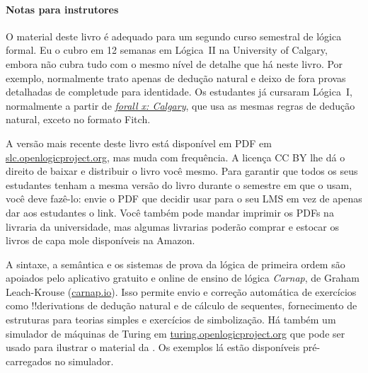 \paragraph{Notas para instrutores} O material deste livro é adequado
para um segundo curso semestral de lógica formal. Eu o cubro em 12
semanas em Lógica~II na University of Calgary, embora não cubra tudo
com o mesmo nível de detalhe que há neste livro. Por exemplo,
normalmente trato apenas de dedução natural e deixo de fora provas
detalhadas de completude para identidade. Os estudantes já cursaram
Lógica~I, normalmente a partir de
\emph{\href{https://forallx.openlogicproject.org}{forall x: Calgary}},
que usa as mesmas regras de dedução natural, exceto no formato Fitch.

A versão mais recente deste livro está disponível em PDF em
\href{https://slc.openlogicproject.org}{slc.openlogicproject.org}, mas
muda com frequência. A licença CC BY lhe dá o direito de baixar e
distribuir o livro você mesmo. Para garantir que todos os seus
estudantes tenham a mesma versão do livro durante o semestre em que o
usam, você deve fazê-lo: envie o PDF que decidir usar para o seu LMS
em vez de apenas dar aos estudantes o link. Você também pode mandar
imprimir os PDFs na livraria da universidade, mas algumas livrarias
poderão comprar e estocar os livros de capa mole disponíveis na Amazon.

A sintaxe, a semântica e os sistemas de prova da lógica de primeira
ordem são apoiados pelo aplicativo gratuito e online de ensino de
lógica \emph{Carnap}, de Graham Leach-Krouse
(\href{https://carnap.io}{carnap.io}). Isso permite envio e correção
automática de exercícios como !!{derivation}s de dedução natural e de
cálculo de sequentes, fornecimento de estruturas para teorias simples
e exercícios de simbolização. Há também um simulador de máquinas de
Turing em
\href{https://turing.openlogicproject.org}{turing.openlogicproject.org}
que pode ser usado para ilustrar o material da .
Os exemplos lá estão disponíveis pré-carregados no simulador.

